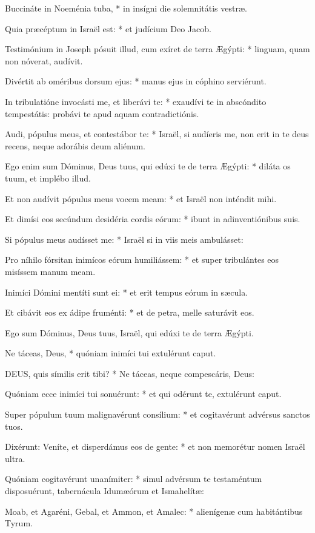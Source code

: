 Buccináte in Noeménia tuba, * in insígni die solemnitátis vestræ.

Quia præcéptum in Israël est: * et judícium Deo Jacob.

Testimónium in Joseph pósuit illud, cum exíret de terra Ægýpti: * linguam, quam non nóverat, audívit.

Divértit ab oméribus dorsum ejus: * manus ejus in cóphino serviérunt.

In tribulatióne invocásti me, et liberávi te: * exaudívi te in abscóndito tempestátis: probávi te apud aquam contradictiónis.

Audi, pópulus meus, et contestábor te: * Israël, si audíeris me, non erit in te deus recens, neque adorábis deum aliénum.

Ego enim sum Dóminus, Deus tuus, qui edúxi te de terra Ægýpti: * diláta os tuum, et implébo illud.

Et non audívit pópulus meus vocem meam: * et Israël non inténdit mihi.

Et dimísi eos secúndum desidéria cordis eórum: * ibunt in adinventiónibus suis.

Si pópulus meus audísset me: * Israël si in viis meis ambulásset:

Pro níhilo fórsitan inimícos eórum humiliássem: * et super tribulántes eos misíssem manum meam.

Inimíci Dómini mentíti sunt ei: * et erit tempus eórum in sæcula.

Et cibávit eos ex ádipe fruménti: * et de petra, melle saturávit eos.

 Ego sum Dóminus, Deus tuus, Israël, qui edúxi te de terra Ægýpti.

 Ne táceas, Deus, * quóniam inimíci tui extulérunt caput.


\lettrine[lines=2]{D}{EUS}, quis símilis erit tibi? * Ne táceas, neque compescáris, Deus:

Quóniam ecce inimíci tui sonuérunt: * et qui odérunt te, extulérunt caput.

Super pópulum tuum malignavérunt consílium: * et cogitavérunt advérsus sanctos tuos.

Dixérunt: Veníte, et disperdámus eos de gente: * et non memorétur nomen Israël ultra.

Quóniam cogitavérunt unanímiter: * simul advérsum te testaméntum disposuérunt, tabernácula Idumæórum et Ismahelítæ:

Moab, et Agaréni, Gebal, et Ammon, et Amalec: * alienígenæ cum habitántibus Tyrum.


